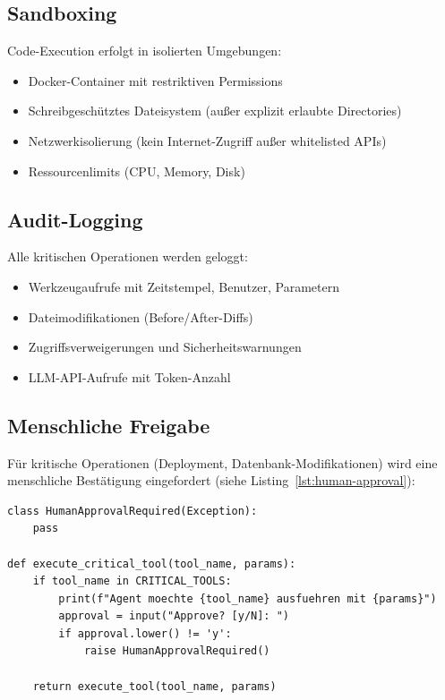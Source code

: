 \subsection{Sandboxing}

Code-Execution erfolgt in isolierten Umgebungen:
\begin{itemize}
  \item Docker-Container mit restriktiven Permissions
  \item Schreibgeschütztes Dateisystem (außer explizit erlaubte Directories)
  \item Netzwerkisolierung (kein Internet-Zugriff außer whitelisted APIs)
  \item Ressourcenlimits (CPU, Memory, Disk)
\end{itemize}

\subsection{Audit-Logging}

Alle kritischen Operationen werden geloggt:
\begin{itemize}
  \item Werkzeugaufrufe mit Zeitstempel, Benutzer, Parametern
  \item Dateimodifikationen (Before/After-Diffs)
  \item Zugriffsverweigerungen und Sicherheitswarnungen
  \item LLM-API-Aufrufe mit Token-Anzahl
\end{itemize}

\subsection{Menschliche Freigabe}

Für kritische Operationen (Deployment, Datenbank-Modifikationen) wird eine menschliche Bestätigung eingefordert (siehe Listing~\ref{lst:human-approval}):

\begin{lstlisting}[style=Python, caption={Human-Approval-Mechanismus (Pseudocode)}, label={lst:human-approval}]
class HumanApprovalRequired(Exception):
    pass

def execute_critical_tool(tool_name, params):
    if tool_name in CRITICAL_TOOLS:
        print(f"Agent moechte {tool_name} ausfuehren mit {params}")
        approval = input("Approve? [y/N]: ")
        if approval.lower() != 'y':
            raise HumanApprovalRequired()
    
    return execute_tool(tool_name, params)
\end{lstlisting}

